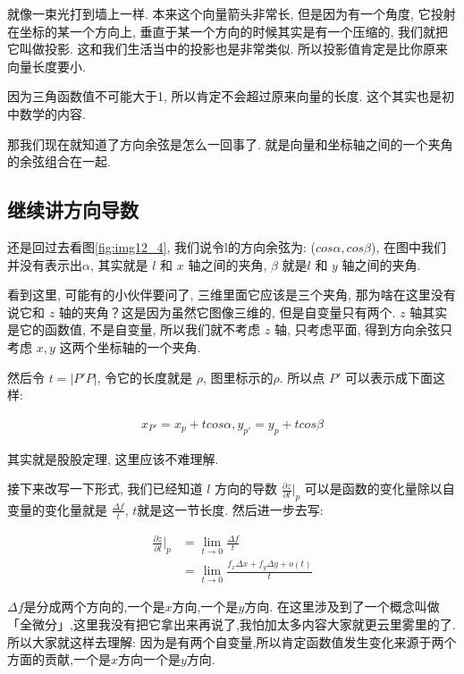 就像一束光打到墙上一样. 本来这个向量箭头非常长, 但是因为有一个角度, 它投射在坐标的某一个方向上, 垂直于某一个方向的时候其实是有一个压缩的, 我们就把它叫做投影. 这和我们生活当中的投影也是非常类似. 所以投影值肯定是比你原来向量长度要小. 

因为三角函数值不可能大于1, 所以肯定不会超过原来向量的长度. 这个其实也是初中数学的内容. 

那我们现在就知道了方向余弦是怎么一回事了. 就是向量和坐标轴之间的一个夹角的余弦组合在一起. 

\subsection{继续讲方向导数}

还是回过去看图\ref{fig:img12_4}, 我们说令l的方向余弦为: ($cos \alpha , cos \beta$), 在图中我们并没有表示出$\alpha$, 其实就是 $l$ 和 $x$ 轴之间的夹角, $\beta$ 就是$l$ 和 $y$ 轴之间的夹角. 

看到这里, 可能有的小伙伴要问了, 三维里面它应该是三个夹角, 那为啥在这里没有说它和 $z$ 轴的夹角？这是因为虽然它图像三维的, 但是自变量只有两个. $z$ 轴其实是它的函数值, 不是自变量, 所以我们就不考虑 $z$ 轴, 只考虑平面, 得到方向余弦只考虑 $x, y$ 这两个坐标轴的一个夹角. 

然后令 $t = |P'P|$, 令它的长度就是 $\rho$, 图里标示的$\rho$. 所以点 $P'$ 可以表示成下面这样: 

\begin{align*}
  x_{P'} = x_p + t cos \alpha, y_{p'} = y_p + t cos \beta
\end{align*}

其实就是股股定理, 这里应该不难理解. 

接下来改写一下形式, 我们已经知道 $l$ 方向的导数 $\frac{\partial z}{\partial l} \Bigg \vert _p$ 可以是函数的变化量除以自变量的变化量就是 $\frac{\Delta f}{t}$, $t$就是这一节长度. 然后进一步去写:

\begin{align*}
  \frac{\partial z}{\partial l} \Bigg \vert _p & = \lim_{t \to 0}\frac{\Delta f}{t} \\
  & = \lim_{t \to 0} \frac{f_x\Delta x + f_y \Delta y + o(t)}{t}
\end{align*}

$\Delta f$是分成两个方向的,一个是$x$方向,一个是$y$方向. 在这里涉及到了一个概念叫做「全微分」,这里我没有把它拿出来再说了,我怕加太多内容大家就更云里雾里的了. 所以大家就这样去理解: 因为是有两个自变量,所以肯定函数值发生变化来源于两个方面的贡献,一个是$x$方向一个是$y$方向. 

